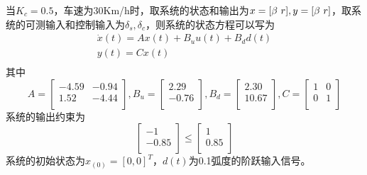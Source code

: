 \documentclass[UTF8]{article}
\begin{document}
当$K_{c}=0.5$，车速为30Km/h时，取系统的状态和输出为$x=[\beta \hbox{ } r],y=[\beta \hbox{ } r]$，取系统的可测输入和控制输入为$\delta_{s},\delta_{c}$，则系统的状态方程可以写为
\begin{equation}
    \begin{array}{c}
        \dot{x}(t)= Ax(t)+B_{u}u(t)+B_{d}d(t)\\
        y(t) = Cx(t)\\
    \end{array}
\end{equation}
其中
\[
    A=
    \left[
        \begin{array}{cc}
            -4.59 & -0.94\\
            1.52 & -4.44 \\
        \end{array}
    \right],
    B_{u}=
    \left[
        \begin{array}{c}
            2.29 \\
            -0.76 \\
        \end{array}
    \right],
    B_{d}=
    \left[
        \begin{array}{c}
            2.30 \\
            10.67 \\
        \end{array}
    \right],
    C=
    \left[
        \begin{array}{cc}
            1&0 \\
            0&1 \\
        \end{array}
    \right]
\]
系统的输出约束为
\[
    \left[
        \begin{array}{c}
            -1 \\
            -0.85 \\
        \end{array}
    \right]
    \leq
    \left[
        \begin{array}{c}
            1 \\
            0.85 \\
        \end{array}
    \right]
\]
系统的初始状态为$x_(0)=[0,0]^T$，$d(t)$为0.1弧度的阶跃输入信号。
\end{document}

